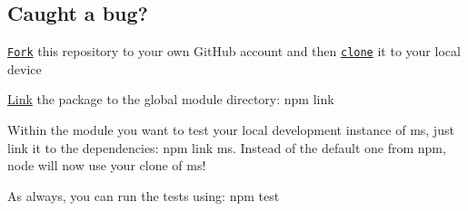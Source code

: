 \subsection*{Caught a bug?}


\begin{DoxyEnumerate}
\item \href{https://help.github.com/articles/fork-a-repo/}{\tt Fork} this repository to your own Git\+Hub account and then \href{https://help.github.com/articles/cloning-a-repository/}{\tt clone} it to your local device
\item \mbox{\hyperlink{structLink}{Link}} the package to the global module directory\+: {\ttfamily npm link}
\item Within the module you want to test your local development instance of ms, just link it to the dependencies\+: {\ttfamily npm link ms}. Instead of the default one from npm, node will now use your clone of ms!
\end{DoxyEnumerate}

As always, you can run the tests using\+: {\ttfamily npm test} 